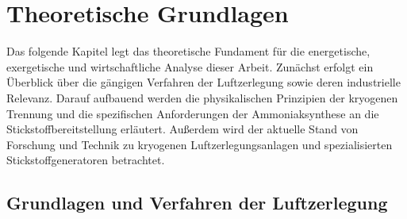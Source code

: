 \chapter{Theoretische Grundlagen}
\label{ch:grundlagen}

Das folgende Kapitel legt das theoretische Fundament für die energetische, exergetische und wirtschaftliche Analyse dieser Arbeit. Zunächst erfolgt ein Überblick über die gängigen Verfahren der Luftzerlegung sowie deren industrielle Relevanz. Darauf aufbauend werden die physikalischen Prinzipien der kryogenen Trennung und die spezifischen Anforderungen der Ammoniaksynthese an die Stickstoffbereitstellung erläutert. Außerdem wird der aktuelle Stand von Forschung und Technik zu kryogenen Luftzerlegungsanlagen und spezialisierten Stickstoffgeneratoren betrachtet.


\section{Grundlagen und Verfahren der Luftzerlegung}
\label{sec:grundlagen_luftzerlegung}

